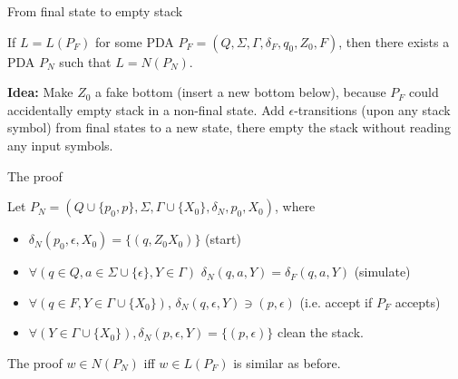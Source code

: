 \documentclass[handout]{beamer}
\begin{document}
\begin{frame}{From final state to empty stack}

    \begin{lemma}
        If $L=L(P_F)$ for some PDA  
        $P_F=(Q,\Sigma,\Gamma,\delta_F,q_0,Z_0,F)$, then there exists a PDA $P_N$ such that $L=N(P_N)$.
    \end{lemma} 
    
    \begin{center}
    \end{center}
    \vspace{-12pt}

    \textbf{Idea:} Make $Z_0$ a fake bottom (insert a new bottom below), because $P_F$ could accidentally empty stack in a non-final state. Add $\epsilon$-transitions (upon any stack symbol) from final states to a new state, there empty the stack without reading any input symbols.

\end{frame}


\begin{frame}{The proof}

    Let $P_N=(Q\cup \{p_0,p\},\Sigma,\Gamma\cup\{X_0\},\delta_N,p_0,X_0)$, where
    \begin{itemize}
        \item $\delta_N(p_0,\epsilon,X_0)=\{(q,Z_0X_0)\}$ (start)
        \item $\forall (q\in Q, a \in \Sigma\cup\{\epsilon\},Y\in \Gamma)$ $\delta_N(q,a,Y)=\delta_F(q,a,Y)$ (simulate)
        \item $\forall (q \in F,Y\in \Gamma\cup\{X_0\})$, $\delta_N(q,\epsilon,Y)\ni (p,\epsilon)$ (i.e. accept if $P_F$ accepts)
        \item $\forall (Y\in \Gamma\cup\{X_0\}), \delta_N(p,\epsilon,Y)=\{ (p,\epsilon)\}$ clean the stack.
    \end{itemize}
    The proof $w\in N(P_N)$ iff $w\in L(P_F)$ is similar as before.\hfill\qedsymbol

\end{frame}
\end{document}
